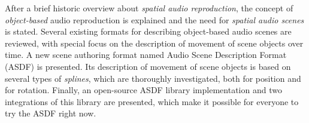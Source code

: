 After a brief historic overview
about \emph{spatial audio reproduction},
the concept of \emph{object-based} audio reproduction is explained
and the need for \emph{spatial audio scenes} is stated.
Several existing formats for describing object-based audio scenes
are reviewed,
with special focus on the description of 
movement of scene objects over time.
A new scene authoring format named
Audio Scene Description Format (ASDF) is presented.
Its description of movement of scene objects
is based on several types of \emph{splines},
which are thoroughly investigated, both for position and for rotation.
Finally, an open-source ASDF library implementation
and two integrations of this library
are presented, which make it possible for everyone to try the ASDF right now.
